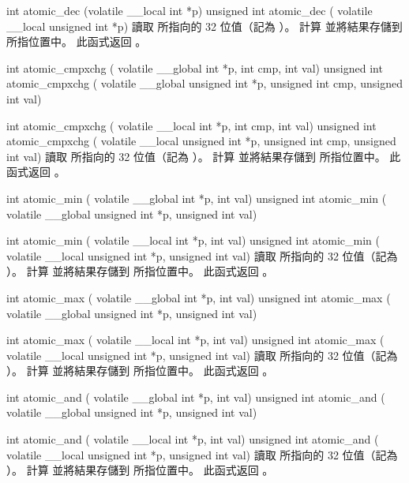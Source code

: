 int atomic_dec (volatile __local int *p)
unsigned int atomic_dec (
	volatile __local unsigned int *p)
\stopbuffer
{}
讀取  所指向的 32 位值（記為 ）。
計算  並將結果存儲到  所指位置中。
此函式返回 。
\stopbuffer

int atomic_cmpxchg (
	volatile __global int *p,
	int cmp, int val)
unsigned int atomic_cmpxchg (
	volatile __global unsigned int *p,
	unsigned int cmp,
	unsigned int val)

int atomic_cmpxchg (
	volatile __local int *p,
	int cmp,
	int val)
unsigned int atomic_cmpxchg (
	volatile __local unsigned int *p,
	unsigned int cmp,
	unsigned int val)
\stopbuffer
{}
讀取  所指向的 32 位值（記為 ）。
計算  並將結果存儲到  所指位置中。
此函式返回 。
\stopbuffer

int atomic_min (
	volatile __global int *p,
	int val)
unsigned int atomic_min (
	volatile __global unsigned int *p,
	unsigned int val)

int atomic_min (
	volatile __local int *p,
	int val)
unsigned int atomic_min (
	volatile __local unsigned int *p,
	unsigned int val)
\stopbuffer
{}
讀取  所指向的 32 位值（記為 ）。
計算  並將結果存儲到  所指位置中。
此函式返回 。
\stopbuffer

int atomic_max (
	volatile __global int *p,
	int val)
unsigned int atomic_max (
	volatile __global unsigned int *p,
	unsigned int val)

int atomic_max (
	volatile __local int *p,
	int val)
unsigned int atomic_max (
	volatile __local unsigned int *p,
	unsigned int val)
\stopbuffer
{}
讀取  所指向的 32 位值（記為 ）。
計算  並將結果存儲到  所指位置中。
此函式返回 。
\stopbuffer

int atomic_and (
	volatile __global int *p,
	int val)
unsigned int atomic_and (
	volatile __global unsigned int *p,
	unsigned int val)

int atomic_and (
	volatile __local int *p,
	int val)
unsigned int atomic_and (
	volatile __local unsigned int *p,
	unsigned int val)
\stopbuffer
{}
讀取  所指向的 32 位值（記為 ）。
計算  並將結果存儲到  所指位置中。
此函式返回 。
\stopbuffer

